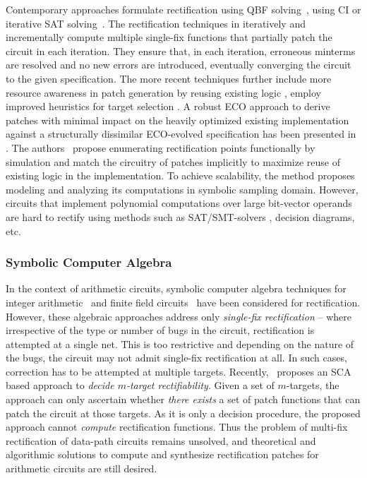 Contemporary approaches formulate rectification
using QBF solving~\cite{scholl:2}, using CI or iterative SAT
solving~\cite{MF_Roland:ICCAD10,MF_Huang:DATE12}.  
The rectification techniques in 
\cite{SS_Fujita:ISCAS19,MF_Huang:DATE12,SS_Roland:DAC18} 
iteratively and incrementally compute multiple single-fix functions
that partially patch the circuit in each iteration.
{\red They ensure that, in each iteration, erroneous minterms are resolved
and no new errors are introduced, eventually converging the circuit
to the given specification.}
The more recent techniques further
include more resource awareness in patch generation by reusing
existing logic \cite{SS_Alan:DAC18}, employ improved heuristics for
target selection \cite{SS_Fujita:ISCAS19}.
{\red A robust ECO approach to derive patches with minimal 
impact on the heavily optimized existing implementation against 
a structurally dissimilar ECO-evolved specification has been presented in
\cite{SS_Roland:DAC19}. 
The authors~\cite{SS_Roland:DAC19} propose enumerating rectification points 
functionally by simulation and match the circuitry of patches implicitly to maximize reuse of 
existing logic in the implementation. To achieve scalability, the method proposes 
modeling and analyzing its computations in symbolic sampling domain. 
However, circuits that implement polynomial computations over large
bit-vector operands are hard to rectify using methods such as SAT/SMT-solvers
, decision diagrams, etc.
}

\subsubsection{Symbolic Computer Algebra}

In the context of arithmetic circuits, symbolic computer algebra 
techniques for integer arithmetic~\cite{farimah:2017:1,MF_Rolf:ISVLSI18} and
finite field circuits~\cite{Utkarsh:ETS19,Utkarsh:VLSI18,Vkrao:FMCAD18}
have been considered for rectification. However, these algebraic
approaches address only {\it single-fix rectification} -- where
irrespective of the type or number of bugs in the circuit,
rectification is attempted at a single net. This is too restrictive
and depending on the nature of the bugs, the circuit may not admit
single-fix rectification at all. In such cases, correction has to be
attempted at multiple targets.
Recently,~\cite{Vkrao:ISQED21} proposes an SCA based approach to 
{\it decide $m$-target rectifiability}. Given a set of $m$-targets,
the approach can only ascertain whether {\it there exists} a set of
patch functions that can patch the circuit at those targets. As 
it is only a decision procedure, the proposed approach cannot 
{\it compute} rectification functions.
Thus the problem of multi-fix rectification of data-path circuits
remains unsolved, and theoretical and algorithmic solutions to compute
and synthesize rectification patches for arithmetic circuits are still
desired. 

